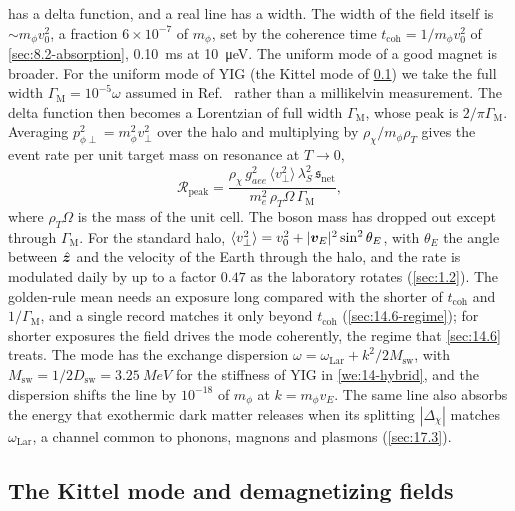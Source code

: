  has a delta function, and a real line has a width. The width of the field itself is $\sim m_\phi v_0^2$, a fraction $6\times10^{-7}$ of $m_\phi$, set by the coherence time $t_{\mathrm{coh}} = 1/m_\phi v_0^2$ of \cref{sec:8.2-absorption}, \SI{0.10}{ms} at \SI{10}{\micro eV}. The uniform mode of a good magnet is broader. For the uniform mode of YIG (the Kittel mode of \cref{sec:14.3-kittel}) we take the full width $\varGamma_{\mathrm{M}} = 10^{-5}\omega$ assumed in Ref.~\cite[Sect.~V\,B]{mitridate2020detectability} rather than a millikelvin measurement. The delta function then becomes a Lorentzian of full width $\varGamma_{\mathrm{M}}$, whose peak is $2/\pi\varGamma_{\mathrm{M}}$. Averaging $p_{\phi\perp}^2 = m_\phi^2v_\perp^2$ over the halo and multiplying by $\rho_\chi/m_\phi\rho_T$ gives the event rate per unit target mass on resonance at $T \to 0$,
\begin{equation}
  \mathcal{R}_{\mathrm{peak}} = \frac{\rho_\chi\,g_{aee}^2\,\langle v_\perp^2\rangle\,\lambda_S^2\,\mathfrak{s}_{\mathrm{net}}}{m_e^2\,\rho_T\Omega\,\varGamma_{\mathrm{M}}} ,
  \label{eq:14.3-peak}
\end{equation}
where $\rho_T\Omega$ is the mass of the unit cell. The boson mass has dropped out except through $\varGamma_{\mathrm{M}}$. For the standard halo, $\langle v_\perp^2\rangle = v_0^2 + |\bm{v}_E|^2\sin^2\theta_E$, with $\theta_E$ the angle between $\hat{\bm{z}}$ and the velocity of the Earth through the halo, and the rate is modulated daily by up to a factor $0.47$ as the laboratory rotates (\cref{sec:1.2}). The golden-rule mean needs an exposure long compared with the shorter of $t_{\mathrm{coh}}$ and $1/\varGamma_{\mathrm{M}}$, and a single record matches it only beyond $t_{\mathrm{coh}}$ (\cref{sec:14.6-regime}); for shorter exposures the field drives the mode coherently, the regime that \cref{sec:14.6} treats. The mode has the exchange dispersion $\omega = \omega_{\mathrm{Lar}} + k^2/2M_{\mathrm{sw}}$, with $M_{\mathrm{sw}} = 1/2D_{\mathrm{sw}} = \SI{3.25}{MeV}$ for the stiffness of YIG in \cref{we:14-hybrid}, and the dispersion shifts the line by $10^{-18}$ of $m_\phi$ at $k = m_\phi v_E$. The same line also absorbs the energy that exothermic dark matter releases when its splitting $|\Delta_\chi|$ matches $\omega_{\mathrm{Lar}}$, a channel common to phonons, magnons and plasmons (\cref{sec:17.3}).

\subsection{The Kittel mode and demagnetizing fields}\label{sec:14.3-kittel}

